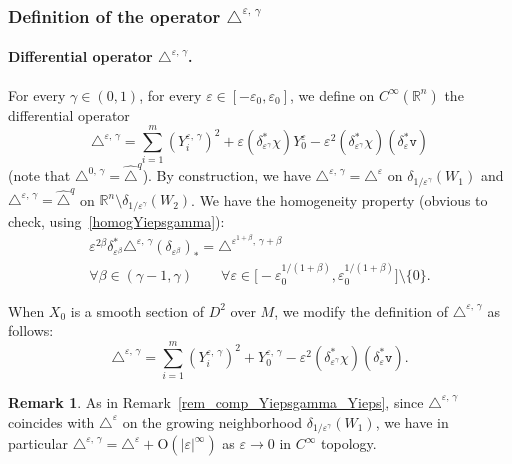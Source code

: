 \documentclass[10pt]{amsart}
\theoremstyle{definition}\newtheorem{defi}[theo]{Definition}\newtheorem{rema}[theo]{Remark}\newtheorem{exam}[theo]{Example}\newtheorem{exem}[theo]{Example}\newtheorem{nota}[theo]{Notation}
\newcommand*\R{\mathbb{R}}
\newcommand{\ttv}{\mathtt{v}}
\newcommand{\rmO}{\mathrm{O}}
\let\oldforall\forall
\renewcommand*{\forall}{\mathrel{\oldforall}}
\begin{document}
\subsubsection{Definition of the operator \texorpdfstring{$\triangle^{\varepsilon,\,\gamma}$}{triangle varepsilon, gamma}}\label{sec_def_deltaepsgam}
\paragraph{Differential operator $\triangle^{\varepsilon,\,\gamma}$.} For every $\gamma\in(0,1)$, for every $\varepsilon\in[-\varepsilon_0,\varepsilon_0]$, we define on $C^\infty(\R^n)$ the differential operator
\begin{equation}\label{def_triangleepsgamma}
\triangle^{\varepsilon,\,\gamma} = \sum_{i=1}^m \left(Y^{\varepsilon,\,\gamma}_i \right)^2 + \varepsilon \left(\delta_{\varepsilon^\gamma}^*\chi\right) Y^\varepsilon_0 - \varepsilon^2 \left(\delta_{\varepsilon^\gamma}^*\chi\right)\left(\delta_\varepsilon^*\ttv \right)
\end{equation}
(note that $\triangle^{0,\,\gamma} = \widehat{\triangle}^{q}$). By construction, we have $\triangle^{\varepsilon,\,\gamma} = \triangle^\varepsilon$ on $\delta_{1/\varepsilon^\gamma}(W_1)$ and $\triangle^{\varepsilon,\,\gamma} = \widehat{\triangle}^{q}$ on $\R^n\setminus\delta_{1/\varepsilon^\gamma}(W_2)$. We have the homogeneity property (obvious to check, using~\eqref{homogYiepsgamma}):
\begin{multline}\label{homog_deltaepsgamma}
\varepsilon^{2\beta} \delta_{\varepsilon^\beta}^* \triangle^{\varepsilon,\,\gamma} \left(\delta_{\varepsilon^\beta}\right)_* = \triangle^{\varepsilon^{1+\beta},\,\gamma+\beta} \\
\forall\beta\in(\gamma-1,\gamma) \qquad\forall \varepsilon\in\big[-\varepsilon_0^{1/(1+\beta)},\varepsilon_0^{1/(1+\beta)}\big]\setminus\{0\}.
\end{multline}

When $X_0$ is a smooth section of $D^2$ over $M$, we modify the definition of $\triangle^{\varepsilon,\,\gamma}$ as follows:
\[
\triangle^{\varepsilon,\,\gamma} = \sum_{i=1}^m \left(Y^{\varepsilon,\,\gamma}_i \right)^2 + Y^{\varepsilon,\,\gamma}_0 - \varepsilon^2 (\delta_{\varepsilon^\gamma}^*\chi) \left(\delta_\varepsilon^*\ttv \right).
\]

\begin{rema}\label{rem_comp_triangleepsgamma_triangleeps}
As in Remark~\ref{rem_comp_Yiepsgamma_Yieps}, since $\triangle^{\varepsilon,\,\gamma}$ coincides with $\triangle^\varepsilon$ on the growing neighborhood $\delta_{1/\varepsilon^\gamma}(W_1)$, we have in particular $\triangle^{\varepsilon,\,\gamma} = \triangle^\varepsilon + \rmO(\vert\varepsilon\vert^\infty)$ as $\varepsilon\rightarrow 0$ in $C^\infty$ topology.
\end{rema}
\end{document}
